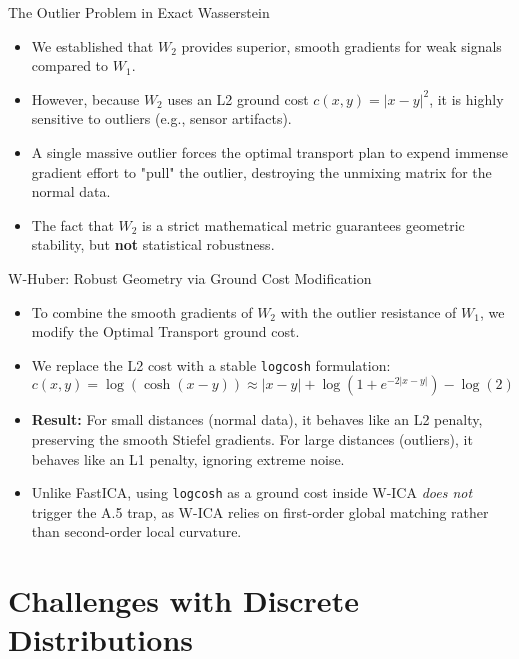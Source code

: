 \documentclass{beamer}
\begin{document}
\begin{frame}{The Outlier Problem in Exact Wasserstein}
  \begin{itemize}
    \item We established that $W_2$ provides superior, smooth gradients for weak signals compared to $W_1$.
    \item However, because $W_2$ uses an L2 ground cost $c(x,y) = |x - y|^2$, it is highly sensitive to outliers (e.g., sensor artifacts). 
    \item A single massive outlier forces the optimal transport plan to expend immense gradient effort to "pull" the outlier, destroying the unmixing matrix for the normal data.
    \item The fact that $W_2$ is a strict mathematical metric guarantees geometric stability, but \textbf{not} statistical robustness.
  \end{itemize}
\end{frame}

\begin{frame}{W-Huber: Robust Geometry via Ground Cost Modification}
  \begin{itemize}
    \item To combine the smooth gradients of $W_2$ with the outlier resistance of $W_1$, we modify the Optimal Transport ground cost.
    \item We replace the L2 cost with a stable \texttt{logcosh} formulation:
    \[
      c(x,y) = \log(\cosh(x-y)) \approx |x-y| + \log(1 + e^{-2|x-y|}) - \log(2)
    \]
    \item \textbf{Result:} For small distances (normal data), it behaves like an L2 penalty, preserving the smooth Stiefel gradients. For large distances (outliers), it behaves like an L1 penalty, ignoring extreme noise.
    \item Unlike FastICA, using \texttt{logcosh} as a ground cost inside W-ICA \textit{does not} trigger the A.5 trap, as W-ICA relies on first-order global matching rather than second-order local curvature.
  \end{itemize}
\end{frame}



\section{Challenges with Discrete Distributions}
\end{document}

